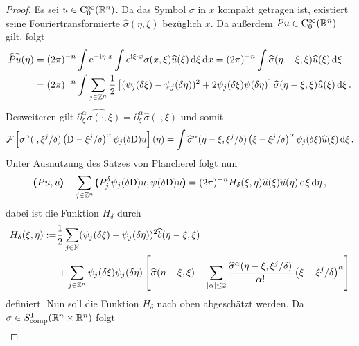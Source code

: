 \begin{proof}
Es sei $u\in\mathrm C^\infty_0(\mathbb R^n)$. Da das Symbol $\sigma$ in $x$ kompakt getragen ist, existiert seine Fouriertransformierte $\widehat\sigma (\eta,\xi)$ bezüglich $x$. Da außerdem $ P u\in\mathrm C^\infty_0(\mathbb R^n)$ gilt, folgt
\begin{align}
\begin{split}
\widehat{ P u}(\eta) &= (2\pi)^{-n}\int \mathrm e^{-\mathrm i\eta\cdot x} \int e^{\mathrm i\xi\cdot x}\sigma(x,\xi) \widehat u (\xi) \,\mathrm d\xi\,\mathrm d x = (2\pi)^{-n}\int \widehat\sigma(\eta - \xi,\xi)\widehat u(\xi)\,\mathrm d\xi \\
&= (2\pi)^ {-n}\int \sum_{j\in\mathbb Z^n} \frac 1 2\left[(\psi_j(\delta \xi) - \psi_j(\delta \eta))^2 + 2 \psi_j(\delta\xi)\psi(\delta \eta)\right] \widehat\sigma(\eta - \xi,\xi)\widehat u(\xi)\,\mathrm d\xi\,.
\end{split}
\end{align}
Desweiteren gilt $\widehat{\partial^\alpha_\xi\sigma(\cdot,\xi)} = \partial_\xi^\alpha\widehat \sigma(\cdot,\xi)$ und somit
\begin{align}
\mathcal{F}\left[\sigma^\alpha(\cdot,\xi^j/\delta)\left( \mathrm D - \xi^j/\delta\right)^\alpha\psi_j(\delta\mathrm D)u\right](\eta) = \int \widehat \sigma^\alpha(\eta-\xi,\xi^j/\delta)\left( \xi - \xi^j/\delta\right)^\alpha\psi_j(\delta\xi)\widehat u(\xi)\,\mathrm d\xi\,.
\end{align}
Unter Ausnutzung des Satzes von Plancherel folgt nun
\begin{align}
\pmb(Pu,u\pmb)  - \sum_{j\in\mathbb Z^n}\pmb( P_j^\delta\psi_j(\delta\mathrm D )u, \psi(\delta\mathrm D )u \pmb) = (2\pi)^{-n} \relax H_\delta (\xi,\eta) \widehat u(\xi)\widehat u(\eta)\,\mathrm d\xi\,\mathrm d\eta\,,
\end{align}
dabei ist die Funktion $H_\delta$ durch
\begin{align}\label{eq:hdeltadef}
\begin{split}
H_\delta(\xi,\eta) := &\frac 1 2 \sum_{j\in \mathbb N}(\psi_j(\delta \xi) - \psi_j(\delta \eta))^2\widehat b(\eta-\xi,\xi)\\
&+ \sum_{j\in\mathbb Z^n} \psi_j(\delta\xi)\psi_j(\delta \eta)\left[
\widehat \sigma(\eta-\xi,\xi) - \sum_{\lvert\alpha\rvert \le 2} \frac{\widehat\sigma^\alpha(\eta-\xi,\xi^j/\delta)}{\alpha!}\left( \xi - \xi^j/\delta\right)^\alpha
\right]
\end{split}
\end{align}
definiert. Nun soll die Funktion $H_\delta$ nach oben abgeschätzt werden. Da $\sigma\in S^1_{\rm comp}(\mathbb R^n\times\mathbb R^n)$ folgt
\begin{align}

\end{align}
\end{proof}
